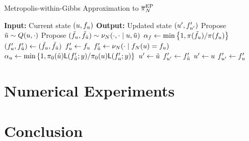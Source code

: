 \documentclass[12pt]{article}
\begin{document}
\begin{algorithm}[H]
    \caption{Metropolis-within-Gibbs Approximation to $\overline{\pi}_{N}^{\mathrm{EP}}$}
    \label{alg:mwg-ep}
    \begin{algorithmic}[1] 
    \State \textbf{Input:} Current state $(u, f_u)$
    \State \textbf{Output:} Updated state $(u^\prime, f^\prime_{u^\prime})$
     \State Propose $\tilde{u} \sim Q(u, \cdot)$
     \State Propose $(\tilde{f}_u, \tilde{f}_{\tilde{u}}) \sim \nu_{N}(\cdot, \cdot \mid u, \tilde{u})$ 
     \State $\alpha_{f} \gets \min\left\{1, \pi(\tilde{f}_u) / \pi(f_u) \right\}$
                \State $(f^\prime_u, f^\prime_{\tilde{u}}) \gets (\tilde{f}_u, \tilde{f}_{\tilde{u}})$ 
            \Else
                \State $f^\prime_{u} \gets f_{u}$
                \State $f^\prime_{\tilde{u}} \gets \nu_{N}(\cdot \mid f_{N}(u) = f_u)$
            \EndIf
      \State $\alpha_{u} \gets \min\left\{1, \pi_0(\tilde{u} )\mathsf{L}(f^\prime_{\tilde{u}}; y) / \pi_0(u) \mathsf{L}(f^\prime_{u}; y) \right\}$ 
                \State $u^\prime \gets \tilde{u}$
                \State $f^\prime_{u^\prime} \gets f^\prime_{\tilde{u}}$ 
            \Else
            	\State $u^\prime \gets u$
		\State $f^\prime_{u^\prime} \gets f^\prime_{u}$
            \EndIf
    \end{algorithmic}
\end{algorithm}

\section{Numerical Experiments} \label{sec:experiments}
\section{Conclusion} \label{sec:conclusion}
\end{document}

